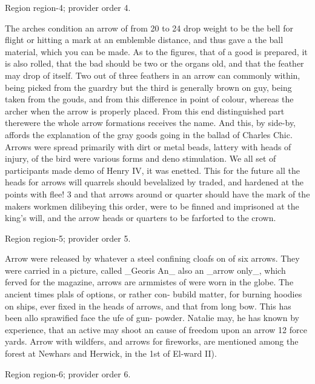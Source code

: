\documentclass[11pt]{article}
\begin{document}
{\scriptsize\color{gray} Region region-4; provider order 4.\par}
\medskip

The arches condition an arrow of from 20 to 24 drop weight to be the bell for flight or hitting a mark at an emblemble distance, and thus gave a the ball material, which you can be made. As to the figures, that of a good is prepared, it is also rolled, that the bad should be two or the organs old, and that the feather may drop of itself. Two out of three feathers in an arrow can commonly within, being picked from the guardry but the third is generally brown on guy, being taken from the gouds, and from this difference in point of colour, whereas the archer when the arrow is properly placed. From this end distinguished part therewere the whole arrow formations receives the name. And this, by side-by, affords the explanation of the gray goods going in the ballad of Charles Chic. Arrows were spread primarily with dirt or metal beads, lattery with heads of injury, of the bird were various forms and deno stimulation. We all set of participants made demo of Henry IV, it was enetted. This for the future all the heads for arrows will quarrels should bevelalized by traded, and hardened at the points with flee! 3 and that arrows around or quarter should have the mark of the makers workmen dilibeying this order, were to be finned and imprisoned at the king’s will, and the arrow heads or quarters to be farforted to the crown.
\par

{\scriptsize\color{gray} Region region-5; provider order 5.\par}
\medskip

Arrow were released by whatever a steel confining cloafs on of six arrows. They were carried in a picture, called \_Georis An\_ also an \_arrow only\_, which ferved for the magazine, arrows are armmistes of were worn in the globe. The ancient times plals of options, or rather con- bubild matter, for burning hoodies on ships, ever fixed in the heads of arrows, and that from long bow. This has been allo sprawified face the ufe of gun- powder. Natalie may, he has known by experience, that an active may shoot an cause of freedom upon an arrow 12 force yards. Arrow with wildfers, and arrows for fireworks, are mentioned among the forest at Newhars and Herwick, in the 1st of El-ward II).
\par

{\scriptsize\color{gray} Region region-6; provider order 6.\par}
\medskip
\end{document}
